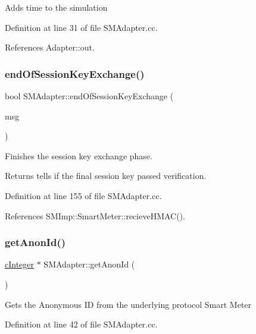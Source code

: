 Adds time to the simulation 

Definition at line 31 of file S\+M\+Adapter.\+cc.



References Adapter\+::out.

\mbox{\label{classSMAdapter_adcce474ffc3ad9717b3307ac95fa1445}} 
\subsubsection{\texorpdfstring{end\+Of\+Session\+Key\+Exchange()}{endOfSessionKeyExchange()}}
{\footnotesize\ttfamily bool S\+M\+Adapter\+::end\+Of\+Session\+Key\+Exchange (\begin{DoxyParamCaption}\item[{omnetpp\+::c\+Message $\ast$}]{msg }\end{DoxyParamCaption})}

Finishes the session key exchange phase. \begin{DoxyReturn}{Returns}
tells if the final session key passed verification. 
\end{DoxyReturn}


Definition at line 155 of file S\+M\+Adapter.\+cc.



References S\+M\+Imp\+::\+Smart\+Meter\+::recieve\+H\+M\+A\+C().

\mbox{\label{classSMAdapter_a586f83c19527bf0401a50424c24eece1}} 
\subsubsection{\texorpdfstring{get\+Anon\+Id()}{getAnonId()}}
{\footnotesize\ttfamily \hyperlink{classcInteger}{c\+Integer} $\ast$ S\+M\+Adapter\+::get\+Anon\+Id (\begin{DoxyParamCaption}{ }\end{DoxyParamCaption})}

Gets the Anonymous ID from the underlying protocol Smart Meter 

Definition at line 42 of file S\+M\+Adapter.\+cc.



